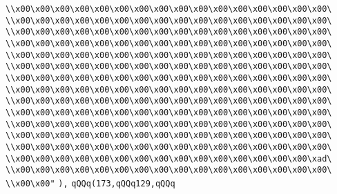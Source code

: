 \verb|\\x00\x00\x00\x00\x00\x00\x00\x00\x00\x00\x00\x00\x00\x00\x00\x00\|\newline
\verb|\\x00\x00\x00\x00\x00\x00\x00\x00\x00\x00\x00\x00\x00\x00\x00\x00\|\newline
\verb|\\x00\x00\x00\x00\x00\x00\x00\x00\x00\x00\x00\x00\x00\x00\x00\x00\|\newline
\verb|\\x00\x00\x00\x00\x00\x00\x00\x00\x00\x00\x00\x00\x00\x00\x00\x00\|\newline
\verb|\\x00\x00\x00\x00\x00\x00\x00\x00\x00\x00\x00\x00\x00\x00\x00\x00\|\newline
\verb|\\x00\x00\x00\x00\x00\x00\x00\x00\x00\x00\x00\x00\x00\x00\x00\x00\|\newline
\verb|\\x00\x00\x00\x00\x00\x00\x00\x00\x00\x00\x00\x00\x00\x00\x00\x00\|\newline
\verb|\\x00\x00\x00\x00\x00\x00\x00\x00\x00\x00\x00\x00\x00\x00\x00\x00\|\newline
\verb|\\x00\x00\x00\x00\x00\x00\x00\x00\x00\x00\x00\x00\x00\x00\x00\x00\|\newline
\verb|\\x00\x00\x00\x00\x00\x00\x00\x00\x00\x00\x00\x00\x00\x00\x00\x00\|\newline
\verb|\\x00\x00\x00\x00\x00\x00\x00\x00\x00\x00\x00\x00\x00\x00\x00\x00\|\newline
\verb|\\x00\x00\x00\x00\x00\x00\x00\x00\x00\x00\x00\x00\x00\x00\x00\x00\|\newline
\verb|\\x00\x00\x00\x00\x00\x00\x00\x00\x00\x00\x00\x00\x00\x00\x00\x00\|\newline
\verb|\\x00\x00\x00\x00\x00\x00\x00\x00\x00\x00\x00\x00\x00\x00\x00\xad\|\newline
\verb|\\x00\x00\x00\x00\x00\x00\x00\x00\x00\x00\x00\x00\x00\x00\x00\x00\|\newline
\verb|\\x00\x00"|\newline
\verb|),|\newline
\verb|qQQq(173,qQQq129,qQQq|\newline
